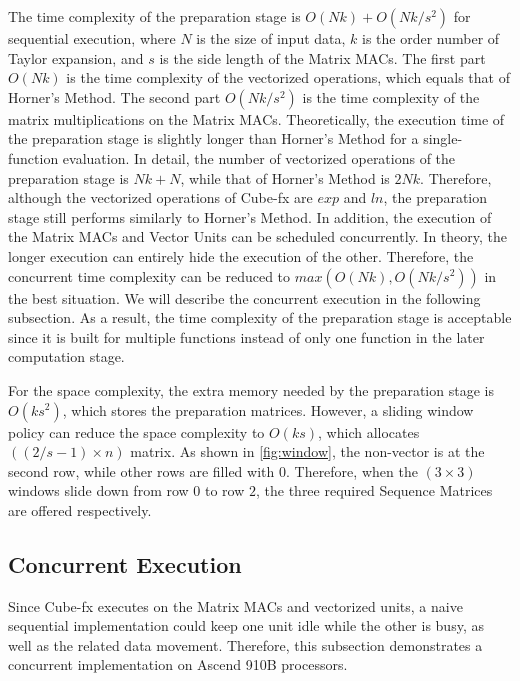 The time complexity of the preparation stage is $O(Nk) + O(Nk / s^2)$ for sequential execution, where $N$ is the size of input data, $k$ is the order number of Taylor expansion, and $s$ is the side length of the Matrix MACs. The first part $O(Nk)$ is the time complexity of the vectorized operations, which equals that of Horner's Method. The second part $O(Nk / s^2)$ is the time complexity of the matrix multiplications on the Matrix MACs. Theoretically, the execution time of the preparation stage is slightly longer than Horner's Method for a single-function evaluation. In detail, the number of vectorized operations of the preparation stage is $Nk + N$, while that of Horner's Method is $2Nk$. Therefore, although the vectorized operations of Cube-fx are $exp$ and $ln$, the preparation stage still performs similarly to Horner's Method. In addition, the execution of the Matrix MACs and Vector Units can be scheduled concurrently. In theory, the longer execution can entirely hide the execution of the other. Therefore, the concurrent time complexity can be reduced to $max(O(Nk), O(Nk / s^2))$ in the best situation. We will describe the concurrent execution in the following subsection. As a result, the time complexity of the preparation stage is acceptable since it is built for multiple functions instead of only one function in the later computation stage. 

For the space complexity, the extra memory needed by the preparation stage is $O(ks^2)$, which stores the preparation matrices. However, a sliding window policy can reduce the space complexity to $O(ks)$, which allocates $((2/s - 1) \times n)$ matrix. As shown in \ref{fig:window}, the non-vector is at the second row, while other rows are filled with $0$. Therefore, when the $(3 \times 3)$ windows slide down from row $0$ to row $2$, the three required Sequence Matrices are offered respectively.

\subsection{Concurrent Execution \label{sec:3.3}}

Since Cube-fx executes on the Matrix MACs and vectorized units, a naive sequential implementation could keep one unit idle while the other is busy, as well as the related data movement. Therefore, this subsection demonstrates a concurrent implementation on Ascend 910B processors.


